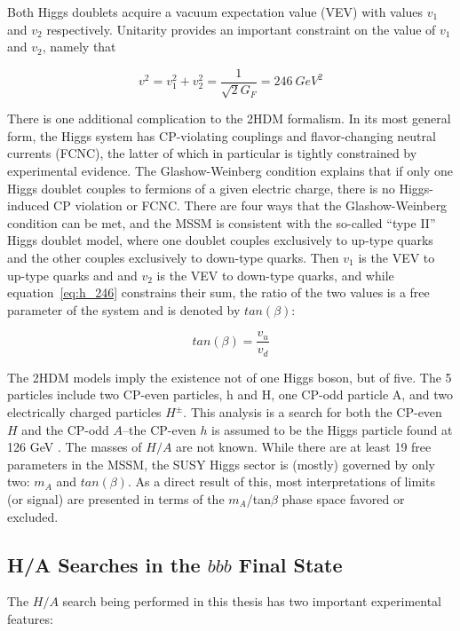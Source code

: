 

Both Higgs doublets acquire a vacuum expectation value (VEV) with values $v_1$ and $v_2$ respectively.  Unitarity provides an important constraint on the value of $v_1$ and $v_2$, namely that 

\begin{equation}
	v^2 = v_1^2 + v_2^2 = \frac{1}{\sqrt{2}G_F} = 246\ GeV^2
	\label{eq:h_246}
\end{equation}


There is one additional complication to the 2HDM formalism.  In its most general form, the Higgs system has CP-violating couplings and flavor-changing neutral currents (FCNC), the latter of which in particular is tightly constrained by experimental evidence.  The Glashow-Weinberg condition explains that if only one Higgs doublet couples to fermions of a given electric charge, there is no Higgs-induced CP violation or FCNC.  There are four ways that the Glashow-Weinberg condition can be met, and the MSSM is consistent with the so-called ``type II'' Higgs doublet model, where one doublet couples exclusively to up-type quarks and the other couples exclusively to down-type quarks.  Then $v_1$ is the VEV to up-type quarks and and $v_2$ is the VEV to down-type quarks, and while equation~\ref{eq:h_246} constrains their sum, the ratio of the two values is a free parameter of the system and is denoted by $tan(\beta)$:

\begin{equation}
	tan(\beta) = \frac{v_u}{v_d}
\end{equation}




The 2HDM models imply the existence not of one Higgs boson, but of five.  The 5 particles include two CP-even particles, h and H, one CP-odd particle A, and two electrically charged particles $H^\pm$.   This analysis is a search for both the CP-even $H$ and the CP-odd $A$--the CP-even $h$ is assumed to be the Higgs particle found at 126 GeV \cite{PDG-Review}.  The masses of $H/A$ are not known.  While there are at least 19 free parameters in the MSSM, the SUSY Higgs sector is (mostly) governed by only two: $m_A$ and $tan(\beta)$.  As a direct result of this, most interpretations of limits (or signal) are presented in terms of the $m_A$/tan$\beta$ phase space favored or excluded.  


\subsection{H/A Searches in the $bbb$ Final State}
The $H/A$ search being performed in this thesis has two important experimental features:

